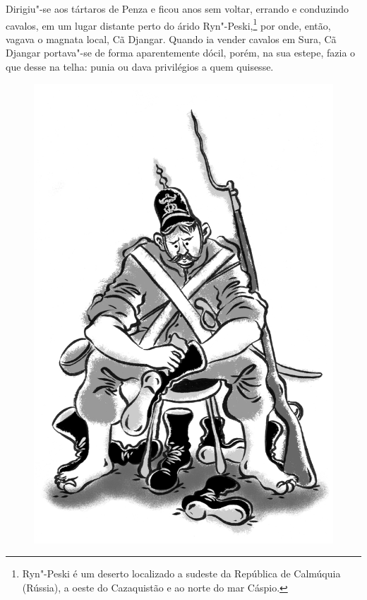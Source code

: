 Dirigiu"-se aos tártaros de Penza e ficou anos sem voltar, errando e
conduzindo cavalos, em um lugar distante perto do árido
Ryn"-Peski,\footnote{Ryn"-Peski é um deserto localizado a sudeste da
  República de Calmúquia (Rússia), a oeste do Cazaquistão e ao norte do
  mar Cáspio.} por onde, então, vagava o magnata local, Cã Djangar.
Quando ia vender cavalos em Sura, Cã Djangar portava"-se de forma
aparentemente dócil, porém, na sua estepe, fazia o que desse na telha:
punia ou dava privilégios a quem quisesse.

\begin{figure}%
\vspace*{-1.6cm}
\hspace*{-1.8cm}\includegraphics{./imgs/cena5.jpg}
\end{figure}

